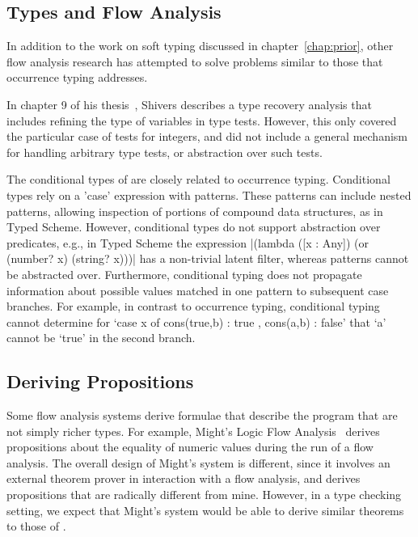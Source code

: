 \begin{schemeregion}
\section{Types and Flow Analysis}

In addition to the work on soft typing discussed in
chapter~\ref{chap:prior}, other flow analysis research has attempted to
solve problems similar to those that occurrence typing addresses.  

In chapter
9 of his thesis~\cite{shivers-thesis}, Shivers describes a type
recovery analysis that includes refining the type of variables in type
tests.  However, this only covered the particular case of tests for
integers, and did not include a general mechanism for handling
arbitrary type tests, or abstraction over such tests.  

The conditional types of \citet{awl:popl94} are closely related to
occurrence typing. Conditional types rely on a 'case' expression with
patterns. These patterns can include nested patterns, allowing
inspection of portions of compound data structures, as in Typed
Scheme.  However, conditional types do not support abstraction over
predicates, e.g., in Typed Scheme the expression \scheme|(lambda ([x :
Any]) (or (number? x) (string?  x)))| has a non-trivial latent filter,
whereas patterns cannot be abstracted over. Furthermore, conditional
typing does not propagate information about possible values matched in
one pattern to subsequent case branches.  For example, in contrast to
occurrence typing, conditional typing cannot determine for `case x of
cons(true,b) : true , cons(a,b) : false' that `a' cannot be `true' in
the second branch.

\subsection{Deriving Propositions}

Some flow analysis systems derive formulae that describe the program that are
not simply richer types.  For example, Might's Logic Flow
Analysis~\cite{might:lfa} derives propositions about the equality of
numeric values during the run of a flow analysis. The overall design of
Might's system is different, since it involves an external
theorem prover in interaction with a flow analysis, and derives
propositions that are radically different from mine.  However, in a type
checking setting, we expect that Might's system would be able to
derive similar theorems to those of \lts.  
\end{schemeregion}
